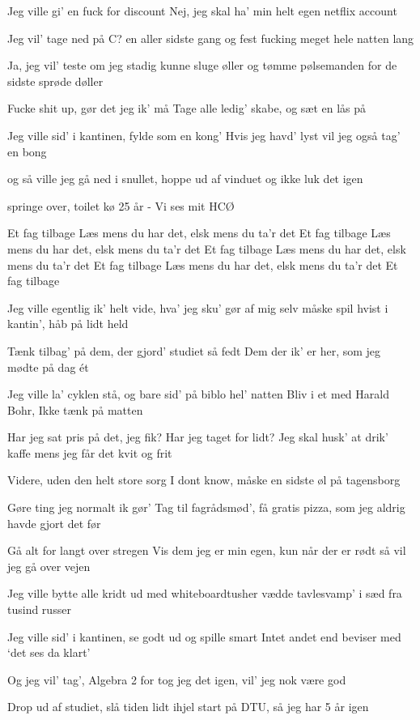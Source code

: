 \documentclass[a4paper,11pt]{article}
\begin{document}
\begin{song}
Jeg ville gi’ en fuck for discount
Nej, jeg skal ha’ min helt egen netflix account

Jeg vil’ tage ned på C? en aller sidste gang
og fest fucking meget hele natten lang

Ja, jeg vil’ teste om jeg stadig kunne sluge øller
og tømme pølsemanden for de sidste sprøde døller

%
Fucke shit up, gør det jeg ik’ må
Tage alle ledig’ skabe, og sæt en lås på

Jeg ville sid’ i kantinen, fylde som en kong’
Hvis jeg havd’ lyst vil jeg også tag’ en bong

og så ville jeg gå ned i snullet, hoppe ud af vinduet
og ikke luk det igen

springe over, toilet kø
25 år - Vi ses mit HCØ

%
Et fag tilbage
Læs mens du har det, elsk mens du ta’r det
Et fag tilbage
Læs mens du har det, elsk mens du ta’r det
Et fag tilbage
Læs mens du har det, elsk mens du ta’r det
Et fag tilbage
Læs mens du har det, elsk mens du ta’r det
Et fag tilbage

%
Jeg ville egentlig ik’ helt vide, hva’ jeg sku’ gør af mig selv
måske spil hvist i kantin’, håb på lidt held

Tænk tilbag’ på dem, der gjord’ studiet så fedt
Dem der ik’ er her, som jeg mødte på dag ét

Jeg ville la’ cyklen stå, og bare sid’ på biblo hel’ natten
Bliv i et med Harald Bohr, Ikke tænk på matten

Har jeg sat pris på det, jeg fik? Har jeg taget for lidt?
Jeg skal husk’ at drik’ kaffe mens jeg får det kvit og frit

%
Videre, uden den helt store sorg
I dont know, måske en sidste øl på tagensborg

Gøre ting jeg normalt ik gør’
Tag til fagrådsmød’, få gratis pizza, som jeg aldrig havde gjort det før

Gå alt for langt over stregen
Vis dem jeg er min egen, kun når der er rødt så vil jeg gå over vejen

Jeg ville bytte alle kridt ud med whiteboardtusher
vædde tavlesvamp’ i sæd fra tusind russer

%
Jeg ville sid’ i kantinen, se godt ud og spille smart
Intet andet end beviser med ‘det ses da klart’

Og jeg vil’ tag’, Algebra 2
for tog jeg det igen, vil’ jeg nok være god

Drop ud af studiet, slå tiden lidt ihjel
start på DTU, så jeg har 5 år igen


\end{song}
\end{document}
